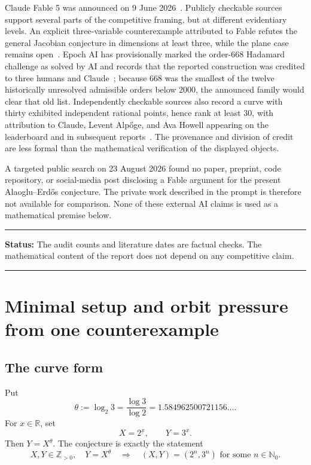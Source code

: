 \documentclass[11pt,oneside]{article}
\theoremstyle{definition}
\theoremstyle{remark}
\newcommand{\Nzero}{\mathbb N_0}
\newcommand{\Z}{\mathbb Z}
\newcommand{\R}{\mathbb R}
\newcommand{\AEconj}{Alaoglu--Erd\H{o}s}
\newcommand{\tht}{\theta}
\newenvironment{statusbox}[1]
{\begin{center}\begin{minipage}{0.95\textwidth}\raggedright\hrule
\vspace{0.45em}\textbf{Status:} #1\par\vspace{0.35em}}
{\vspace{0.35em}\hrule\end{minipage}\end{center}}
\begin{document}
Claude Fable 5 was announced on 9 June 2026~\cite{AnthropicFable2026}.  Publicly checkable
sources support several parts of the competitive framing, but at different evidentiary levels.  An
explicit three-variable counterexample attributed to Fable refutes the general Jacobian conjecture
in dimensions at least three, while the plane case remains open~\cite{JacobianReport2026}.  Epoch
AI has provisionally marked the order-$668$ Hadamard challenge as solved by AI and records that the
reported construction was credited to three humans and Claude~\cite{EpochHadamard2026}; because
$668$ was the smallest of the twelve historically unresolved admissible orders below $2000$, the
announced family would clear that old list.  Independently checkable sources also record a curve
with thirty exhibited independent rational points, hence rank at least $30$, with attribution to
Claude, Levent Alp\H{o}ge, and Ava Howell appearing on the leaderboard and in subsequent
reports~\cite{DujellaRank2026,MathWorldRank2026}.  The provenance and division of credit are less
formal than the mathematical verification of the displayed objects.

A targeted public search on 23 August 2026 found no paper, preprint, code repository, or
social-media post disclosing a Fable argument for the present \AEconj{} conjecture.  The private work
described in the prompt is therefore not available for comparison.  None of these external AI
claims is used as a mathematical premise below.

\begin{statusbox}{The audit counts and literature dates are factual checks.  The mathematical
content of the report does not depend on any competitive claim.}
\end{statusbox}

\section{Minimal setup and orbit pressure from one counterexample}
\label{sec:setup}

\subsection{The curve form}

Put
\begin{equation}
  \tht:=\log_2 3=\frac{\log 3}{\log 2}=1.584962500721156\ldots .
  \label{eq:theta}
\end{equation}
For $x\in\R$, set
\[
  X=2^x,\qquad Y=3^x.
\]
Then $Y=X^{\tht}$.  The conjecture is exactly the statement
\begin{equation}
  X,Y\in\Z_{>0},\quad Y=X^{\tht}
  \quad\Longrightarrow\quad
  (X,Y)=(2^n,3^n)\text{ for some }n\in\Nzero.
  \label{eq:curve-form}
\end{equation}
\end{document}
